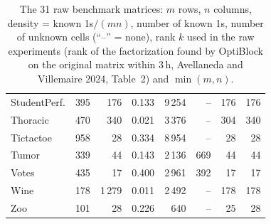 \begin{table}[t]
\begin{tabular}{l rrrrrrr}
StudentPerf. & 395 & 176 & 0.133 & 9\,254 & -- & 176 & 176 \\
Thoracic & 470 & 340 & 0.021 & 3\,376 & -- & 304 & 340 \\
Tictactoe & 958 & 28 & 0.334 & 8\,954 & -- & 28 & 28 \\
Tumor & 339 & 44 & 0.143 & 2\,136 & 669 & 44 & 44 \\
Votes & 435 & 17 & 0.400 & 2\,961 & 392 & 17 & 17 \\
Wine & 178 & 1\,279 & 0.011 & 2\,492 & -- & 178 & 178 \\
Zoo & 101 & 28 & 0.226 & 640 & -- & 25 & 28 \\
\bottomrule
\end{tabular}
\caption{The 31 raw benchmark matrices: $m$ rows, $n$ columns, density = known 1s$/(mn)$, number of known 1s, number of unknown cells (``--'' = none), rank $k$ used in the raw experiments (rank of the factorization found by OptiBlock on the original matrix within 3\,h, Avellaneda and Villemaire 2024, Table~2) and $\min(m,n)$.}
\label{tab:datasets}
\end{table}

